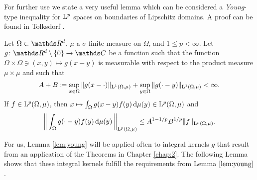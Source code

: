 
For further use we state a very useful lemma which can be considered a \emph{Young}-type inequality for $\mathrm{L}^p$ spaces on boundaries of Lipschitz domains.
A proof can be found in Tolksdorf \cite[Prop 1.1.4]{tolksdorf}.

\begin{lem}
  \label{lem:young}
  Let $\Omega \subset \R^d$, $\mu$ a $\sigma$-finite measure on $\Omega$, and $1 \leq p < \infty$.
  Let $g \colon \R^d \setminus \{ 0\} \to \C$ be a function such that the function $\Omega \times \Omega \ni (x, y) \mapsto g(x-y)$ is measurable with respect to the product measure $\mu \times \mu$ and such that
  \begin{align*}
    A + B \coloneqq \sup_{x \in \Omega} \| g(x - \cdot) \|_{\mathrm{L}^1(\Omega, \mu)} + \sup_{y \in \Omega} \|g(\cdot - y) \|_{\mathrm{L}^1(\Omega, \mu)} < \infty.
  \end{align*}
  If $f \in \mathrm{L}^p(\Omega, \mu)$, then $x \mapsto \int_\Omega g(x - y) f(y) \, {\operatorname{d}\!{\mu}}(y) \in \mathrm{L}^p(\Omega, \mu)$ and
  \begin{align*}
    \bigg\| \int_\Omega g(\cdot - y) f(y) \, {\operatorname{d}\!{\mu}}(y)\, \bigg\|_{\mathrm{L}^p(\Omega, \mu)} \leq A^{1 - 1/p} B^{1/p} \|f\|_{\mathrm{L}^p(\Omega, \mu)}.
  \end{align*}
\end{lem}

For us, Lemma \ref{lem:young} will be applied often to integral kernels $g$ that result from an application of the Theorems in Chapter \ref{chap:2}.
The following Lemma shows that these integral kernels fulfill the requirements from Lemma $\ref{lem:young}$.

